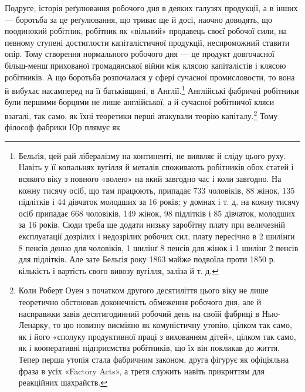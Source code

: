 Подруге, історія реґулювання робочого дня в деяких галузях
продукції, а в інших — боротьба за це реґулювання, що триває
ще й досі, наочно доводять, що поодинокий робітник, робітник як
«вільний» продавець своєї робочої сили, на певному ступені достиглости
капіталістичної продукції, неспроможний ставити опір.
Тому створення нормального робочого дня — це продукт довгочасної
більш-менш прихованої громадянської війни між клясою
капіталістів і клясою робітників. А що боротьба розпочалася
у сфері сучасної промисловости, то вона й вибухає насамперед
на її батьківщині, в Англії.\footnote{
Бельґія, цей рай лібералізму на континенті, не виявляє й сліду
цього руху. Навіть у її копальнях вугілля й металів споживають робітників
обох статей і всякого віку з повного «волею» на який завгодно час і
коли завгодно. На кожну тисячу осіб, що там працюють, припадає 733 чоловіків,
88 жінок, 135 підлітків і 44 дівчаток молодших за 16 років;
у домнах і т. д. на кожну тисячу осіб припадає 668 чоловіків, 149 жінок,
98 підлітків і 85 дівчаток, молодших за 16 років. Сюди треба ще додати
низьку заробітну плату при величезній експлуатації дозрілих і недозрілих
робочих сил, плату пересічно в 2 шилінґи 8 пенсів денно для чоловіків,
1 шилінґ 8 пенсів для жінок і 1 шилінґ 2 пенсів для підлітків.
Але зате Бельґія року 1863 майже подвоїла проти 1850 р. кількість і
вартість свого вивозу вугілля, заліза й т. д.
} Англійські фабричні робітники
були першими борцями не лише англійської, а й сучасної робітничої
кляси взагалі, так само, як їхні теоретики перші атакували
теорію капіталу.\footnote{
Коли Роберт Оуен з початком другого десятиліття цього віку не
лише теоретично обстоював доконечність обмеження робочого дня, але
й насправжки завів десятигодинний робочий день на своїй фабриці в
Нью-Ленарку, то цю новизну висміяно як комуністичну утопію, цілком
так само, як і його «сполуку продуктивної праці з вихованням дітей»,
цілком так само, як і кооперативні підприємства робітників, що їх він покликав
до життя. Тепер перша утопія стала фабричним законом, друга
фігурує як офіціяльна фраза в усіх «Factory Acts», а третя служить
навіть прикриттям для реакційних шахрайств.
} Тому філософ фабрики Юр плямує як
